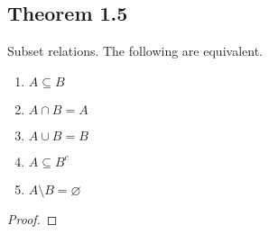 \documentclass[../../main.tex]{subfiles}
\begin{document}
\subsection{Theorem 1.5}
\begin{wts}
    Subset relations. The following are equivalent.
    \begin{enumerate}
        \item $A\subseteq B$
        \item $A\cap B = A$
        \item $A\cup B = B$
        \item $A\subseteq B^c$
        \item $A\setminus B = \varnothing$
    \end{enumerate}
\end{wts}
\begin{proof}

\end{proof}
\end{document}
